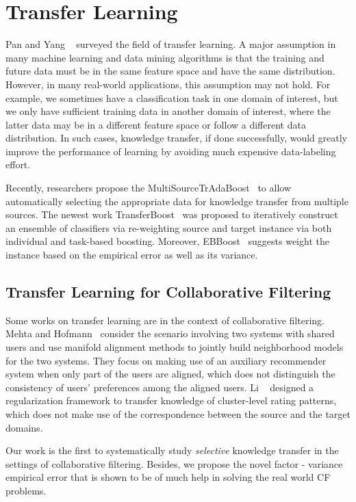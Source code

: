 \section{Transfer Learning} Pan and Yang ~\cite{/tkde/sinno09survey} surveyed the field of transfer learning. A major assumption in many machine learning and data mining algorithms is that the training and future data must be in the same feature space and have the same distribution. However, in many real-world applications, this assumption may not hold. For example, we sometimes have a classification task in one domain of interest, but we only have sufficient training data in another domain of interest, where the latter data may be in a different feature space or follow a different data distribution. In such cases, knowledge transfer, if done successfully, would greatly improve the performance of learning by avoiding much expensive data-labeling effort.

Recently, researchers propose the MultiSourceTrAdaBoost~\cite{/cvpr/YaoD10} to allow automatically selecting the appropriate data for knowledge transfer from multiple sources. The newest work TransferBoost~\cite{/aaai/Eatond11} was proposed to iteratively construct an ensemble of classifiers via re-weighting source and target instance via both individual and task-based boosting. Moreover, EBBoost~\cite{/jmlr/ShivaswamyJ10a} suggests weight the instance based on the empirical error as well as its variance.

\hspace{0.05in}
\subsection{Transfer Learning for Collaborative Filtering}
Some works on transfer learning are in the context of collaborative filtering.
Mehta and Hofmann~\cite{/ki/bhaskar06cross} consider the scenario involving two systems with shared users and use manifold alignment methods to jointly build neighborhood models for the two systems. They focus on making use of an auxiliary recommender system when only part of the users are aligned, which does not distinguish the consistency of users' preferences among the aligned users.
Li \etal~\cite{/icml/libin09} designed a regularization framework to transfer knowledge of cluster-level rating patterns, which does not make use of the correspondence between the source and the target domains.

Our work is the first to systematically study {\em selective} knowledge transfer in the settings of collaborative filtering. Besides, we propose the novel factor - variance empirical error that is shown to be of much help in solving the real world CF problems.

